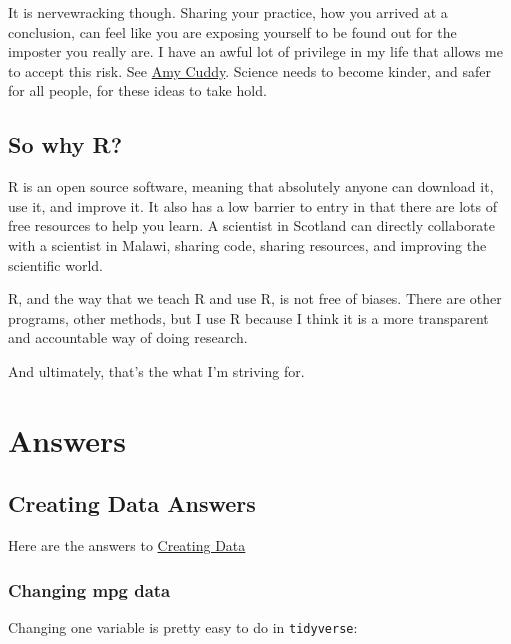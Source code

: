 \documentclass[
]{book}
\newenvironment{Shaded}{\begin{snugshade}}{\end{snugshade}}
\newcommand{\DataTypeTok}[1]{\textcolor[rgb]{0.13,0.29,0.53}{#1}}
\newcommand{\KeywordTok}[1]{\textcolor[rgb]{0.13,0.29,0.53}{\textbf{#1}}}
\newcommand{\NormalTok}[1]{#1}
\newcommand{\OperatorTok}[1]{\textcolor[rgb]{0.81,0.36,0.00}{\textbf{#1}}}
\newcommand{\StringTok}[1]{\textcolor[rgb]{0.31,0.60,0.02}{#1}}
\begin{document}
It is nervewracking though. Sharing your practice, how you arrived at a conclusion, can feel like you are exposing yourself to be found out for the imposter you really are. I have an awful lot of privilege in my life that allows me to accept this risk. See \href{https://www.nytimes.com/2017/10/18/magazine/when-the-revolution-came-for-amy-cuddy.html}{Amy Cuddy}. Science needs to become kinder, and safer for all people, for these ideas to take hold.

\hypertarget{so-why-r}{%
\section{So why R?}\label{so-why-r}}

R is an open source software, meaning that absolutely anyone can download it, use it, and improve it. It also has a low barrier to entry in that there are lots of free resources to help you learn. A scientist in Scotland can directly collaborate with a scientist in Malawi, sharing code, sharing resources, and improving the scientific world.

R, and the way that we teach R and use R, is not free of biases. There are other programs, other methods, but I use R because I think it is a more transparent and accountable way of doing research.

And ultimately, that's the what I'm striving for.

\hypertarget{answers}{%
\chapter{Answers}\label{answers}}

\hypertarget{ans_createdata}{%
\section{Creating Data Answers}\label{ans_createdata}}

Here are the answers to \protect\hyperlink{ex_createdata}{Creating Data}

\hypertarget{changing-mpg-data}{%
\subsection{Changing mpg data}\label{changing-mpg-data}}

Changing one variable is pretty easy to do in \texttt{tidyverse}:

\begin{Shaded}
\end{Shaded}
\end{document}
